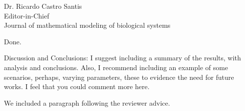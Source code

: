 \documentclass [12pt]{letter}
\begin{document}
\begin{letter}{Dr. Ricardo Castro Santis\\ Editor-in-Chief \\ Journal of mathematical modeling of biological systems}
\begin{enumerate}
	Done.
	
	{\color{black}
	\item Discussion and Conclusions: I suggest including a summary of the results, with
	analysis and conclusions. Also, I recommend including an example of some
	scenarios, perhaps, varying parameters, these to evidence the need for future
	works. I feel that you could comment more here.
	}

	We included a paragraph following the reviewer advice.
	
	
	
\end{enumerate}


\end{letter}
\end{document}

